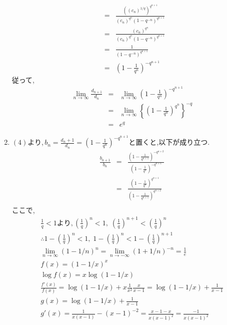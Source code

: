 \documentclass[dvipdfmx,titlepage, 11pt, a4paper]{jsarticle}%
\begin{document}
\begin{enumerate}[(1)]
\begin{eqnarray*}
			  &=&\frac{\left((c_{n})^{1/q}\right)^{q^{n+1}}}{(c_{n})^{q^{n}}(1 - q^{-n})^{q^{n + 1}}}\\
			  &=&\frac{(c_{n})^{q^{n}}}{(c_{n})^{q^{n}}(1 - q^{-n})^{q^{n + 1}}}\\
			  &=&\frac{1}{(1 - q^{-n})^{q^{n + 1}}}\\
			  &=&\left(1 - \frac{1}{q^{n}}\right)^{-q^{n + 1}}
		  \end{eqnarray*}
		  従って,
		  \begin{eqnarray*}
			  \lim_{n\to \infty} \frac{d_{n + 1}}{d_{n}} &=& \lim_{n\to \infty}\left(1 - \frac{1}{q^{n}}\right)^{-q^{n + 1}}\\
			  &=& \lim_{n\to \infty}\left\{\left(1 - \frac{1}{q^{n}}\right)^{q^{n}}\right\}^{-q}\\
			  &=& e^{q}
			\end{eqnarray*}
	\item $(4)$より,$\,b_n = {\displaystyle  \frac{d_n + 1}{d_n}} = {\displaystyle \left(1 - \frac{1}{q^{n}}\right)^{-q^{n + 1}}}$と置くと,以下が成り立つ.
	\begin{eqnarray*}
		\frac{b_{n + 1}}{b_n} &=& \frac{{\displaystyle \left(1 - \frac{1}{q^{n + 1}}\right)^{-q^{n + 2}}}}{{\displaystyle \left(1 - \frac{1}{q^{n}}\right)^{-q^{n + 1}}}}\\
		&=& \frac{{\displaystyle \left(1 - \frac{1}{q^{n}}\right)^{q^{n + 1}}}}{{\displaystyle \left(1 - \frac{1}{q^{n + 1}}\right)^{q^{n + 2}}}}\\
	\end{eqnarray*}
	ここで,
	\begin{eqnarray*}
		\frac{1}{q} < 1より,\left(\frac{1}{q}\right)^{n} < 1, \;\left(\frac{1}{q}\right)^{n + 1} < \left(\frac{1}{q}\right)^{n}\\
		\therefore 1 - \left(\frac{1}{q}\right)^{n} < 1, \; 1 - \left(\frac{1}{q}\right)^{n} < 1 - \left(\frac{1}{q}\right)^{n + 1}\\
		\lim_{n \to \infty}(1 - 1/n)^{n} = \lim_{n \to -\infty}(1 + 1/n)^{-n} = \frac{1}{e}\\
		f(x) = (1 - 1/x)^x\\
		\log f(x) = x\log(1 - 1/x) \\
		\frac{f'(x)}{f(x)} = \log(1 - 1/x) + x\frac{1}{x^2}\frac{x}{x - 1} = \log(1 - 1/x) + \frac{1}{x - 1}\\
		g(x) =  \log(1 - 1/x) + \frac{1}{x - 1}\\
		g'(x) = \frac{1}{x(x - 1)} - (x - 1)^{-2} = \frac{x - 1 - x}{x(x - 1)^2} = \frac{-1}{x(x - 1)^2}\\

\end{eqnarray*}
\end{enumerate}
\end{document}
